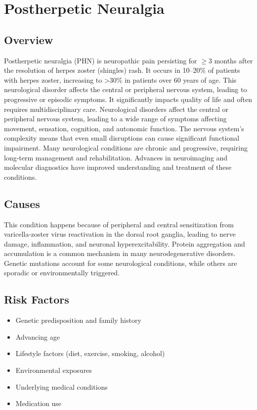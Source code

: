 \chapter{Postherpetic Neuralgia}
\label{sec:Postherpetic Neuralgia}

\section{Overview}
Postherpetic neuralgia (PHN) is neuropathic pain persisting for $\ge$3 months after the resolution of herpes zoster (shingles) rash. It occurs in 10--20\% of patients with herpes zoster, increasing to >30\% in patients over 60 years of age. This neurological disorder affects the central or peripheral nervous system, leading to progressive or episodic symptoms. It significantly impacts quality of life and often requires multidisciplinary care. Neurological disorders affect the central or peripheral nervous system, leading to a wide range of symptoms affecting movement, sensation, cognition, and autonomic function. The nervous system's complexity means that even small disruptions can cause significant functional impairment. Many neurological conditions are chronic and progressive, requiring long-term management and rehabilitation. Advances in neuroimaging and molecular diagnostics have improved understanding and treatment of these conditions.
\section{Causes}
This condition happens because of peripheral and central sensitization from varicella-zoster virus reactivation in the dorsal root ganglia, leading to nerve damage, inflammation, and neuronal hyperexcitability.    Protein aggregation and accumulation is a common mechanism in many neurodegenerative disorders.  Genetic mutations account for some neurological conditions, while others are sporadic or environmentally triggered.   
\section{Risk Factors}
\begin{itemize}[noitemsep]
  \item Genetic predisposition and family history
  \item Advancing age
  \item Lifestyle factors (diet, exercise, smoking, alcohol)
  \item Environmental exposures
  \item Underlying medical conditions
  \item Medication use
\end{itemize}
